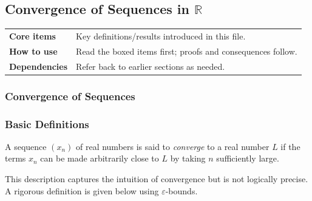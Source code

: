 
\subsection{Convergence of Sequences in $\mathbb{R}$}

\begin{tcolorbox}[colback=gray!6, colframe=gray!40, arc=2pt,
  left=6pt, right=6pt, top=4pt, bottom=4pt,
  title={\small\textbf{Convergence — Quick Reference}},
  fonttitle=\small\bfseries]
\begin{tabular}{@{}p{}p{}@{}}
\textbf{Core items} & Key definitions/results introduced in this file.\\
\textbf{How to use} & Read the boxed items first; proofs and consequences follow.\\
\textbf{Dependencies} & Refer back to earlier sections as needed.\\
\end{tabular}
\end{tcolorbox}


\subsubsection{Convergence of Sequences}

\subsubsection{Basic Definitions}

\begin{tcolorbox}[colback=propbox, colframe=propborder, arc=2pt,
  left=6pt, right=6pt, top=4pt, bottom=4pt,
  title={\small\textbf{Definition (Convergence — informal description)}},
  fonttitle=\small\bfseries]
A sequence $(x_n)$ of real numbers is said to \emph{converge} to a real number $L$
if the terms $x_n$ can be made arbitrarily close to $L$ by taking $n$ sufficiently large.
\end{tcolorbox}

\begin{remark}
This description captures the intuition of convergence but is not logically precise.
A rigorous definition is given below using $\varepsilon$-bounds.
\end{remark}

